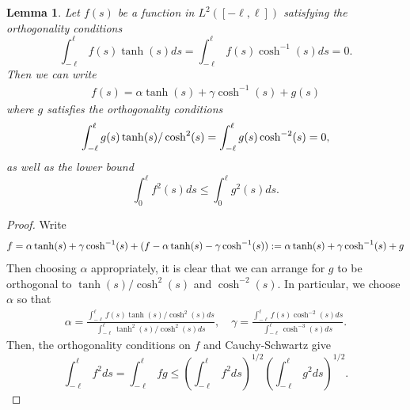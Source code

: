 \documentclass{amsart}
\newtheorem{lemma}{Lemma}
\begin{document}
 \begin{lemma} \label{fOrthogonalPart}
 Let $f(s)$ be a function in  $L^2([-\ell, \ell])$  satisfying the orthogonality conditions
 \[
 \int_{-\ell}^\ell f(s) \tanh(s) ds =  \int_{-\ell}^\ell f(s) \cosh^{-1}(s) ds = 0.
 \]
 Then we can write
 \begin{align} \label{fDecomp}
 f (s) = \alpha \tanh(s) + \gamma \cosh^{-1}(s)  + g (s)
 \end{align}
 where $g$ satisfies the orthogonality  conditions
 \begin{align} \notag
\int_{- \ell}^\ell g(s) \tanh(s) /\cosh^2(s)  = \int_{- \ell}^\ell g(s)\cosh^{-2}(s) = 0 , 
 \end{align}
 as well as the lower bound
 \[
    \int_0^\ell f^2 (s) ds \leq \int_0^\ell g^2 (s) ds.
 \]
 \end{lemma}
 \begin{proof}
Write
\begin{align} \notag
f = \alpha \tanh(s) + \gamma \cosh^{-1}(s) +   (f - \alpha \tanh(s) - \gamma \cosh^{-1}(s))  := \alpha \tanh(s) + \gamma \cosh^{-1}(s) + g
\end{align}
Then choosing $\alpha$ appropriately, it is clear that we can arrange for $g$ to be orthogonal to $\tanh(s)/\cosh^2(s)$ and $\cosh^{-2}(s)$. In particular, we choose $\alpha$ so that 
\begin{align}\label{AlphaExplicit}
\alpha = \frac{\int_{- \ell}^\ell f(s) \tanh(s)/\cosh^2(s) ds}{\int_{- \ell}^\ell \tanh^2(s)/ \cosh^2(s) ds}, \quad  \gamma = \frac{\int_{- \ell}^\ell f(s) \cosh^{-2}(s) ds}{\int_{- \ell}^\ell  \cosh^{-3}(s) ds}.
\end{align}
Then, the orthogonality conditions on $f$ and Cauchy-Schwartz give
\[
\int_{-\ell}^\ell f^2 ds = \int_{-\ell}^\ell f g \leq \left( \int_{-\ell}^\ell f^2 ds\right)^{1/2}  \left( \int_{-\ell}^\ell g^2 ds\right)^{1/2}.
\]
\end{proof}
\end{document}
